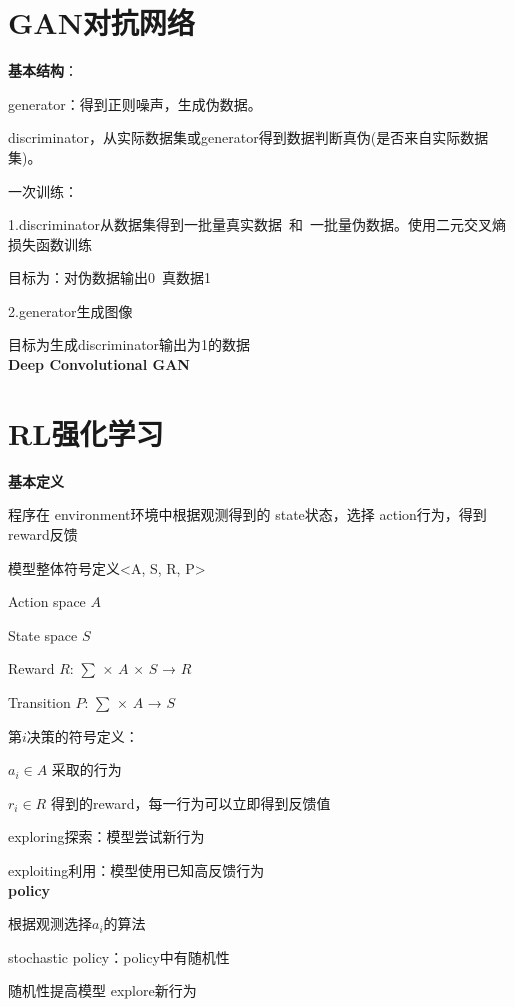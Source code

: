 \documentclass[UTF8]{ctexart}
\begin{document}
\section{GAN对抗网络}
\noindent \textbf{基本结构}：

  generator：得到正则噪声，生成伪数据。
  
  discriminator，从实际数据集或generator得到数据判断真伪(是否来自实际数据集)。

  一次训练：

  \quad 1.discriminator从数据集得到一批量真实数据\ 和\ 一批量伪数据。使用二元交叉熵损失函数训练

  \quad \quad 目标为：对伪数据输出0\ 真数据1

  \quad 2.generator生成图像
  
  \quad \quad 目标为生成discriminator输出为1的数据\\
\textbf{Deep Convolutional GAN}


\section{RL强化学习}
\noindent \textbf{基本定义}

  程序在 environment环境中根据观测得到的 state状态，选择 action行为，得到reward反馈

  模型整体符号定义<A, S, R, P>

  \quad Action space $A$
  
  \quad State space $S$
  
  \quad Reward $R$: $\sum$ × $A$ × $S$ → $R$
  
  \quad Transition $P$: $\sum$ × $A$ → $S$

  第$i$决策的符号定义：

  \quad $a_i \in A$ 采取的行为

  \quad $r_i \in R$ 得到的reward，每一行为可以立即得到反馈值
  
  exploring探索：模型尝试新行为
  
  exploiting利用：模型使用已知高反馈行为\\
\textbf{policy}

  根据观测选择$a_i$的算法

  stochastic policy：policy中有随机性

  \quad 随机性提高模型 explore新行为
\end{document}
